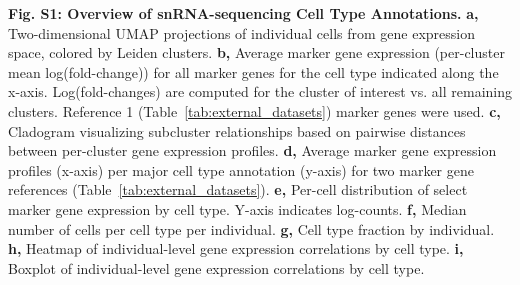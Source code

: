 \documentclass[12pt]{article}
\begin{document}

\textbf{Fig. S1: Overview of snRNA-sequencing Cell Type Annotations.}
\textbf{a,} Two-dimensional UMAP projections of individual cells from gene expression space, colored by Leiden clusters. 
\textbf{b,} Average marker gene expression (per-cluster mean log(fold-change)) for all marker genes for the cell type indicated along the x-axis. Log(fold-changes) are computed for the cluster of interest vs. all remaining clusters. Reference 1 (Table~\ref{tab:external_datasets}) marker genes were used. 
\textbf{c,} Cladogram visualizing subcluster relationships based on pairwise distances between per-cluster gene expression profiles. 
\textbf{d,} Average marker gene expression profiles (x-axis) per major cell type annotation (y-axis) for two marker gene references (Table~\ref{tab:external_datasets}). 
\textbf{e,} Per-cell distribution of select marker gene expression by cell type. Y-axis indicates log-counts. 
\textbf{f,} Median number of cells per cell type per individual. 
\textbf{g,} Cell type fraction by individual. 
\textbf{h,} Heatmap of individual-level gene expression correlations by cell type. 
\textbf{i,} Boxplot of individual-level gene expression correlations by cell type. 
\end{document}
